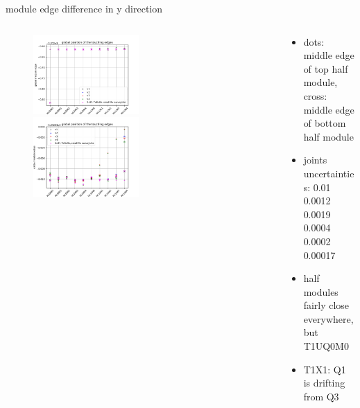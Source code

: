 \documentclass[aspectratio=1610, 12pt]{beamer}
\begin{document}
\begin{frame}{module edge difference in y direction}
  \begin{columns}
    \begin{column}[c]{0.6\textwidth}
      \begin{figure}
        \includegraphics[width=0.5\textwidth]{plots/out_x_y_pos/retest_global_alignT1U.pdf}
        \includegraphics[width=0.5\textwidth]{plots/out_x_y_pos/retest_global_alignT1X1.pdf}
      \end{figure}
    \end{column}
    \begin{column}[c]{0.4\textwidth}
      \begin{itemize}
        \item dots: middle edge of top half module, cross: middle edge of bottom half module
        \item joints uncertainties: 0.01 0.0012 0.0019 0.0004 0.0002 0.00017
        \item \to half modules fairly close everywhere, but T1UQ0M0
        \item T1X1: Q1 is drifting from Q3
      \end{itemize}
    \end{column}
  \end{columns}
\end{frame}
\end{document}
